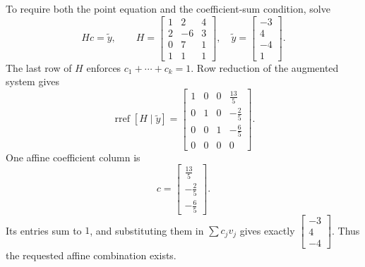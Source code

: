 To require both the point equation and the coefficient-sum condition, solve
\[Hc=\widetilde y,\qquad H=\begin{bmatrix}1&2&4\\2&-6&3\\0&7&1\\1&1&1\end{bmatrix},\quad\widetilde y=\begin{bmatrix}-3\\4\\-4\\1\end{bmatrix}.\]
The last row of $H$ enforces $c_1+\cdots+c_k=1$. Row reduction of the augmented system gives
\[\operatorname{rref}[H\mid\widetilde y]=\begin{bmatrix}1&0&0&\frac{13}{5}\\0&1&0&- \frac{2}{5}\\0&0&1&- \frac{6}{5}\\0&0&0&0\end{bmatrix}.\]
One affine coefficient column is
\[c=\begin{bmatrix}\frac{13}{5}\\- \frac{2}{5}\\- \frac{6}{5}\end{bmatrix}.\]
Its entries sum to $1$, and substituting them in $\sum c_jv_j$ gives exactly $\begin{bmatrix}-3\\4\\-4\end{bmatrix}$. Thus the requested affine combination exists.

